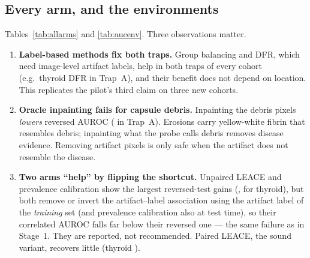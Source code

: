 \subsection{Every arm, and the environments}
Tables~\ref{tab:allarms} and \ref{tab:aucenv}. Three observations matter.
\begin{enumerate}[leftmargin=*]\itemsep1pt
\item \textbf{Label-based methods fix both traps.} Group balancing and DFR, which need image-level artifact labels,
help in both traps of every cohort (e.g.\ thyroid DFR \sThreeArmAThyroiddfr{} in Trap~A), and their benefit does not
depend on location. This replicates the pilot's third claim on three new cohorts.
\item \textbf{Oracle inpainting fails for capsule debris.} Inpainting the debris pixels \emph{lowers} reversed AUROC
(\sThreeArmACapsuleinpaint{} in Trap~A). Erosions carry yellow-white fibrin that resembles debris; inpainting what the
probe calls debris removes disease evidence. Removing artifact pixels is only safe when the artifact does not resemble
the disease.
\item \textbf{Two arms ``help'' by flipping the shortcut.} Unpaired LEACE and prevalence calibration show the largest
reversed-test gains (\sThreeArmAThyroidleaceunpaired, \sThreeArmAThyroidprevcal{} for thyroid), but both remove or
invert the artifact--label association using the artifact label of the \emph{training} set (and prevalence calibration
also at test time), so their correlated AUROC falls far below their reversed one --- the same failure as in Stage~1. They
are reported, not recommended. Paired LEACE, the sound variant, recovers little (thyroid \sThreeArmAThyroidleacepaired).
\end{enumerate}



